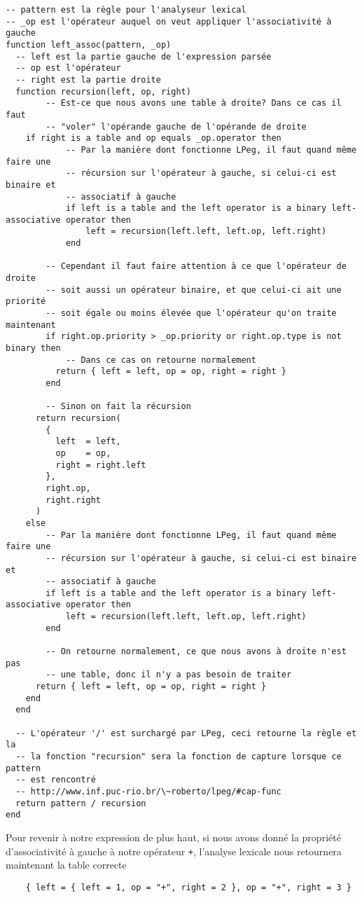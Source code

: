 \documentclass{article}
\begin{document}
\begin{verbatim}
-- pattern est la règle pour l'analyseur lexical
-- _op est l'opérateur auquel on veut appliquer l'associativité à gauche
function left_assoc(pattern, _op)
  -- left est la partie gauche de l'expression parsée
  -- op est l'opérateur
  -- right est la partie droite
  function recursion(left, op, right)
		-- Est-ce que nous avons une table à droite? Dans ce cas il faut
		-- "voler" l'opérande gauche de l'opérande de droite
    if right is a table and op equals _op.operator then
			-- Par la manière dont fonctionne LPeg, il faut quand même faire une
			-- récursion sur l'opérateur à gauche, si celui-ci est binaire et
			-- associatif à gauche
			if left is a table and the left operator is a binary left-associative operator then
				left = recursion(left.left, left.op, left.right)
			end
	    
	    -- Cependant il faut faire attention à ce que l'opérateur de droite
	    -- soit aussi un opérateur binaire, et que celui-ci ait une priorité
	    -- soit égale ou moins élevée que l'opérateur qu'on traite maintenant
	    if right.op.priority > _op.priority or right.op.type is not binary then
		    -- Dans ce cas on retourne normalement
	      return { left = left, op = op, right = right }
	    end
    
	    -- Sinon on fait la récursion
      return recursion(
        {
          left  = left,
          op    = op,
          right = right.left
        },
        right.op,
        right.right
      )
    else
	    -- Par la manière dont fonctionne LPeg, il faut quand même faire une
	    -- récursion sur l'opérateur à gauche, si celui-ci est binaire et
	    -- associatif à gauche
	    if left is a table and the left operator is a binary left-associative operator then
		    left = recursion(left.left, left.op, left.right)
	    end
			
	    -- On retourne normalement, ce que nous avons à droite n'est pas
	    -- une table, donc il n'y a pas besoin de traiter
      return { left = left, op = op, right = right }
    end
  end
  
  -- L'opérateur '/' est surchargé par LPeg, ceci retourne la règle et la 
  -- la fonction "recursion" sera la fonction de capture lorsque ce pattern
  -- est rencontré
  -- http://www.inf.puc-rio.br/\~roberto/lpeg/#cap-func
  return pattern / recursion
end
\end{verbatim}
Pour revenir à notre expression  \noindent de plus haut, si nous avons donné la propriété d'associativité à gauche à notre opérateur \lstinline|+|, l'analyse lexicale nous retournera maintenant la table correcte \begin{verbatim}
	{ left = { left = 1, op = "+", right = 2 }, op = "+", right = 3 }
\end{verbatim}
\end{document}
